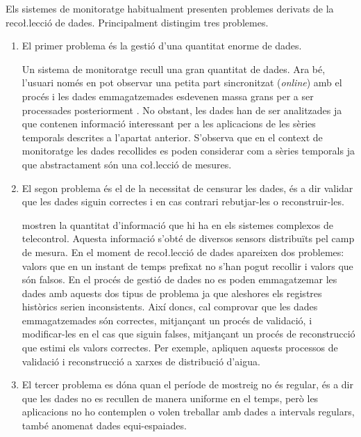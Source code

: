 Els sistemes de monitoratge habitualment presenten problemes derivats
de la reco\l.lecció de dades. Principalment distingim tres problemes.

\textcite[cap.~3]{kopetz11:realtime}


\begin{enumerate}
\item El primer problema és la gestió d'una quantitat enorme de dades. 

Un sistema de monitoratge recull una gran quantitat de dades. Ara bé, l'usuari només en pot observar una petita part sincronitzat (\emph{online}) amb el procés i les dades emmagatzemades esdevenen massa grans per a ser processades posteriorment \parencite{keogh97}. No obstant, les dades han de ser analitzades ja que contenen informació interessant per a les aplicacions de les sèries temporals descrites a l'apartat anterior. S'observa que en el context de monitoratge les dades recollides es poden considerar com a sèries temporals ja que abstractament són una co\l.lecció de mesures.


\item El segon problema és el de la necessitat de censurar les dades, és a dir validar que les dades siguin correctes i en cas contrari rebutjar-les o reconstruir-les. 

\textcite{quevedo10} mostren la quantitat d'informació que hi ha en els sistemes complexos de telecontrol. Aquesta informació s'obté de diversos sensors distribuïts pel camp de mesura.
En el moment de reco\l.lecció de dades apareixen dos problemes: valors que en un instant de temps prefixat no s'han pogut recollir i valors que són falsos. En el procés de gestió de dades no es poden emmagatzemar les dades amb aquests dos tipus de problema ja que aleshores els registres històrics serien inconsistents. 
Així doncs, cal comprovar que les dades emmagatzemades són correctes, mitjançant un procés de validació, i modificar-les en el cas que siguin falses, mitjançant un procés de reconstrucció que estimi els valors correctes. Per exemple, \citeauthor{quevedo10} apliquen aquests processos de validació i reconstrucció a xarxes de distribució d'aigua.


\item El tercer problema es dóna quan el període de mostreig no és regular, és a dir que les dades no es recullen de manera uniforme en el temps, però les aplicacions no ho contemplen o volen treballar amb dades a intervals regulars, també anomenat dades equi-espaiades.


\end{enumerate}
